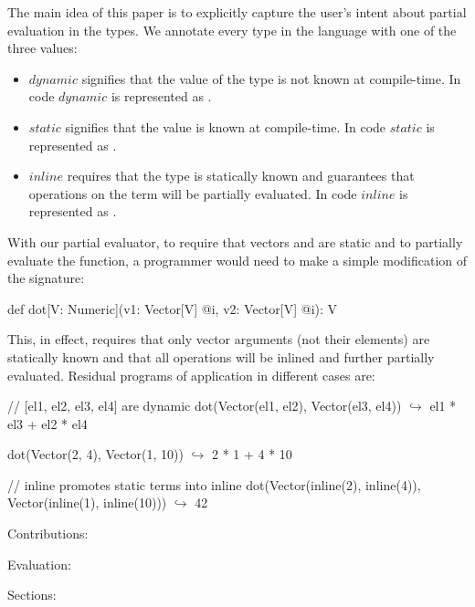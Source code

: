 The main idea of this paper is to explicitly capture the user's intent about partial
evaluation in the types. We annotate every type in the language with one of the three values:
\begin{itemize}
 \item $dynamic$ signifies that the value of the type is not known at compile-time. In code $dynamic$ is represented as .
 \item $static$ signifies that the value is known at compile-time. In code $static$ is represented as .
 \item $inline$ requires that the type is statically known and guarantees that operations on the term will be partially evaluated. In code $inline$ is represented as .
\end{itemize}

With our partial evaluator, to require that vectors  and  are static and
to partially evaluate the function, a programmer would need to make a simple modification of
the  signature:
\vspace{1.8mm}
\begin{listing}
  def dot[V: Numeric](v1: Vector[V] @i, v2: Vector[V] @i): V
\end{listing}
\vspace{1.8mm}
This, in effect, requires that only vector arguments (not their elements) are statically known and that all operations will be inlined and further partially evaluated. Residual programs of  application in different cases are:

\vspace{1.8mm}
\begin{listing}[mathescape]
  // [el1, el2, el3, el4] are dynamic
  dot(Vector(el1, el2), Vector(el3, el4))
    $\hookrightarrow$ el1 * el3 + el2 * el4

  dot(Vector(2, 4), Vector(1, 10))
    $\hookrightarrow$ 2 * 1 + 4 * 10

  // inline promotes static terms into inline
  dot(Vector(inline(2), inline(4)), Vector(inline(1), inline(10)))
    $\hookrightarrow$ 42
\end{listing}
\vspace{1.8mm}

Contributions:

Evaluation:

Sections:
